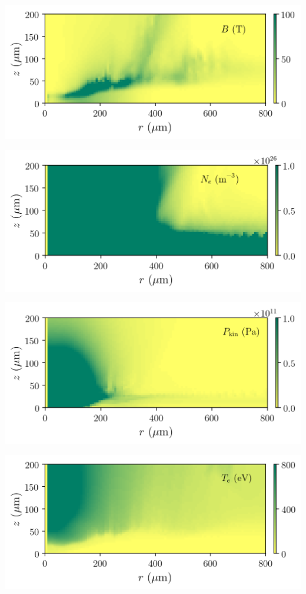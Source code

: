 \documentclass{report}
\begin{document}
\begin{center}
\includegraphics[width=0.8\linewidth]{luli2015_Al-B.png}
\end{center}

\begin{center}
\includegraphics[width=0.8\linewidth]{luli2015_Al-Ne.png}
\end{center}

\begin{center}
\includegraphics[width=0.8\linewidth]{luli2015_Al-P.png}
\end{center}

\begin{center}
\includegraphics[width=0.8\linewidth]{luli2015_Al-Te.png}
\end{center}
\end{document}

